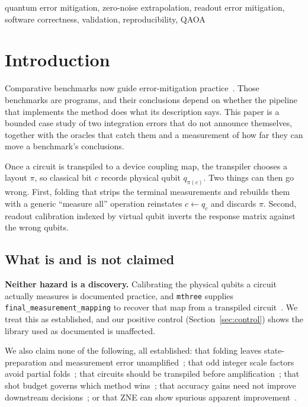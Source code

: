 \documentclass[10pt,conference]{IEEEtran}
\newcommand{\code}[1]{\texttt{\small #1}}
\begin{document}
\begin{IEEEkeywords}
quantum error mitigation, zero-noise extrapolation, readout error mitigation, software correctness,
validation, reproducibility, QAOA
\end{IEEEkeywords}

\section{Introduction}
Comparative benchmarks now guide error-mitigation practice~\cite{cai2023review,bultrini2023,russo2023}.
Those benchmarks are programs, and their conclusions depend on whether the pipeline that implements
the method does what its description says. This paper is a bounded case study of two integration
errors that do not announce themselves, together with the oracles that catch them and a measurement
of how far they can move a benchmark's conclusions.

Once a circuit is transpiled to a device coupling map, the transpiler chooses a layout $\pi$, so
classical bit $c$ records physical qubit $q_{\pi(c)}$. Two things can then go wrong. First, folding
that strips the terminal measurements and rebuilds them with a generic ``measure all'' operation
reinstates $c\leftarrow q_c$ and discards $\pi$. Second, readout calibration indexed by virtual qubit
inverts the response matrix against the wrong qubits.

\subsection*{What is and is not claimed}
\textbf{Neither hazard is a discovery.} Calibrating the physical qubits a circuit actually measures
is documented practice, and \code{mthree} supplies \code{final\_measurement\_mapping} to recover that
map from a transpiled circuit~\cite{nation2021}. We treat this as established, and our positive
control (Section~\ref{sec:control}) shows the library used as documented is unaffected.

We also claim none of the following, all established: that folding leaves state-preparation
and measurement error unamplified~\cite{majumdar2023}; that odd integer scale factors avoid partial
folds~\cite{majumdar2023}; that circuits should be transpiled before amplification~\cite{majumdar2023};
that shot budget governs which method wins~\cite{bultrini2023}; that accuracy gains need not improve
downstream decisions~\cite{scavino2026decision}; or that ZNE can show spurious apparent
improvement~\cite{koester2026}.
\end{document}
